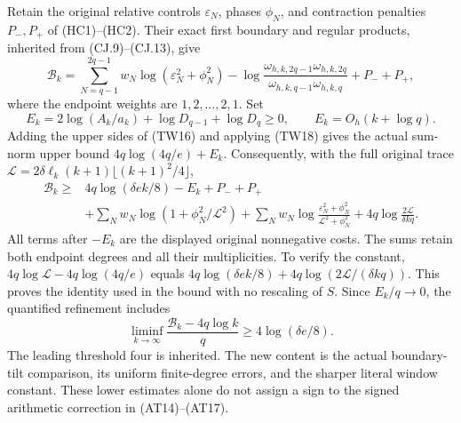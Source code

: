 Retain the original relative controls $\varepsilon_N$, phases $\phi_N$,
and contraction penalties $P_-,P_+$ of (HC1)--(HC2).  Their exact first
boundary and regular products, inherited from (CJ.9)--(CJ.13), give
\[
 \mathcal B_k=\sum_{N=q-1}^{2q-1}w_N
 \log(\varepsilon_N^2+\phi_N^2)
 -\log\frac{\omega_{h,k,2q-1}\omega_{h,k,2q}}
                {\omega_{h,k,q-1}\omega_{h,k,q}}+P_-+P_+,
\]
where the endpoint weights are $1,2,\ldots,2,1$.  Set
\[
 E_k=2\log(A_k/a_k)+\log D_{q-1}+\log D_q\geq0,
 \qquad E_k=O_h(k+\log q).
\]
Adding the upper sides of (TW16) and applying (TW18) gives the
actual sum-norm upper bound $4q\log(4q/e)+E_k$.
Consequently, with the full original trace
$\mathcal L=2\delta\ell_k(k+1)\lfloor(k+1)^2/4\rfloor$,
\[
 \begin{split}
 \mathcal B_k\geq{}&4q\log(\delta e k/8)-E_k+P_-+P_+\\
 &+\sum_Nw_N\log(1+\phi_N^2/\mathcal L^2)
 +\sum_Nw_N\log\frac{\varepsilon_N^2+\phi_N^2}
                           {\mathcal L^2+\phi_N^2}
 +4q\log\frac{2\mathcal L}{\delta kq}.
 \end{split}\tag{TW20}
\]
All terms after $-E_k$ are the displayed original nonnegative costs.
The sums retain both endpoint degrees and all their multiplicities.
To verify the constant, $4q\log\mathcal L-4q\log(4q/e)$ equals
$4q\log(\delta e k/8)+4q\log(2\mathcal L/(\delta kq))$.
This proves the identity used in the bound with no rescaling of $S$.
Since $E_k/q\to0$, the quantified refinement includes
\[
 \liminf_{k\to\infty}
 \frac{\mathcal B_k-4q\log k}{q}
 \geq4\log(\delta e/8).
 \tag{TW21}
\]
The leading threshold four is inherited.  The new content is the
actual boundary-tilt comparison, its uniform finite-degree errors,
and the sharper literal window constant.  These lower estimates
alone do not assign a sign to the signed arithmetic correction in
(AT14)--(AT17).
